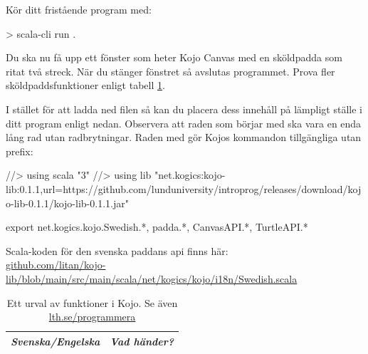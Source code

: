 Kör ditt fristående program med:
\begin{REPLnonum}
> scala-cli run .
\end{REPLnonum}

Du ska nu få upp ett fönster som heter Kojo Canvas med en sköldpadda som ritat två streck. När du stänger fönstret så avslutas programmet. Prova fler sköldpaddsfunktioner enligt tabell \ref{table:kojo:functions}.

I stället för att ladda ned filen  så kan du placera dess innehåll på lämpligt ställe i ditt program enligt nedan. Observera att raden som börjar med  ska vara en enda lång rad utan radbrytningar. Raden med  gör Kojos kommandon tillgängliga utan prefix:
\begin{CodeSmall}[breaklines=true]
//> using scala "3"
//> using lib "net.kogics:kojo-lib:0.1.1,url=https://github.com/lunduniversity/introprog/releases/download/kojo-lib-0.1.1/kojo-lib-0.1.1.jar"

export net.kogics.kojo.Swedish.*, padda.*, CanvasAPI.*, TurtleAPI.*
\end{CodeSmall}


\noindent Scala-koden för den svenska paddans api finns här: \\
\href{https://github.com/litan/kojo-lib/blob/main/src/main/scala/net/kogics/kojo/i18n/Swedish.scala}{github.com/litan/kojo-lib/blob/main/src/main/scala/net/kogics/kojo/i18n/Swedish.scala}




{\small\renewcommand{\arraystretch}{1.4}
\begin{longtable}{@{}p{} p{}}

\caption{Ett urval av funktioner i Kojo. Se även \href{http://lth.se/programmera}{lth.se/programmera}}\label{table:kojo:functions}\\

\emph{Svenska/Engelska} & \emph{Vad händer?}  \\ \hline

\end{longtable}
}%


